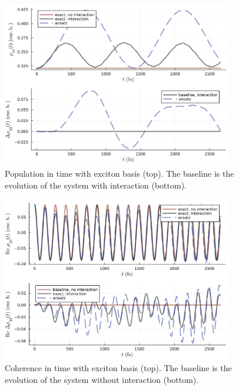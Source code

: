 \begin{figure}[H]
\centering
\includegraphics[width=0.9\textwidth]{img/explain_graphs/explain_graphs_joined_schexc22.png}
\caption{Population in time with exciton basis (top). The baseline is the evolution of the system with interaction (bottom).}
\label{img:explain_graphs_joined_schexc22}
\end{figure}

\begin{figure}[H]
\centering
\includegraphics[width=0.9\textwidth]{img/explain_graphs/explain_graphs_joined_schexc23.png}
\caption{Coherence in time with exciton basis (top). The baseline is the evolution of the system without interaction (bottom).}
\label{img:explain_graphs_joined_schexc23}
\end{figure}

